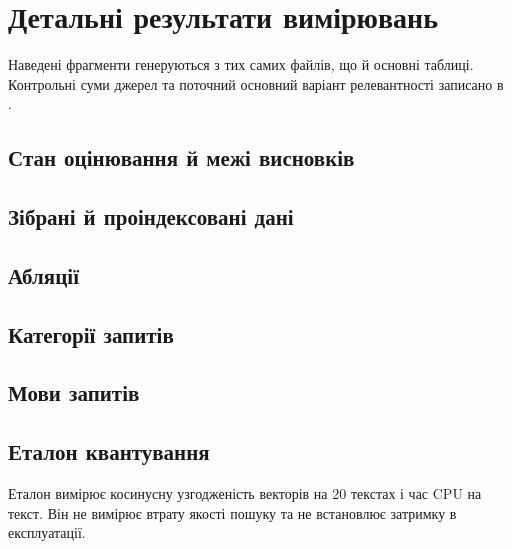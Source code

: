 \clearpage
\section{Детальні результати вимірювань}
Наведені фрагменти генеруються з тих самих файлів, що й основні таблиці. Контрольні суми джерел та поточний основний варіант релевантності записано в .
\subsection{Стан оцінювання й межі висновків}

\subsection{Зібрані й проіндексовані дані}

\clearpage
\subsection{Абляції}

\clearpage
\subsection{Категорії запитів}

\clearpage
\subsection{Мови запитів}

\subsection{Еталон квантування}
Еталон вимірює косинусну узгодженість векторів на 20 текстах і час CPU на текст. Він не вимірює втрату якості пошуку та не встановлює затримку в експлуатації.
\par\medskip

\par
